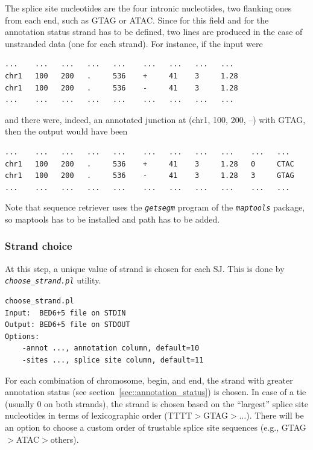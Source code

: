 \documentclass{article}
\newcommand{\prog}[1]{{\tt\em #1}}
\begin{document}
The splice site nucleotides are the four intronic nucleotides, two flanking ones from each end, such as GTAG or ATAC. Since for this field and for the annotation status strand 
has to be defined, two lines are produced in the case of unstranded data (one for each strand). For instance, if the input were
\begin{verbatim}
...    ...   ...   ...   ...    ...   ...   ...   ...
chr1   100   200   .     536    +     41    3     1.28
chr1   100   200   .     536    -     41    3     1.28
...    ...   ...   ...   ...    ...   ...   ...   ...
\end{verbatim}
and there were, indeed, an annotated junction at (chr1, 100, 200, --) with GTAG, then the output would have been
\begin{verbatim}
...    ...   ...   ...   ...    ...   ...   ...   ...    ...   ...
chr1   100   200   .     536    +     41    3     1.28   0     CTAC
chr1   100   200   .     536    -     41    3     1.28   3     GTAG
...    ...   ...   ...   ...    ...   ...   ...   ...    ...   ...
\end{verbatim}

Note that sequence retriever uses the \prog{getsegm} program of the \prog{maptools} package, so maptools has to be installed and path has to be added.


\subsubsection{Strand choice}
At this step, a unique value of strand is chosen for each SJ. This is done by \prog{choose\_strand.pl} utility. 
\begin{verbatim}
choose_strand.pl
Input:  BED6+5 file on STDIN
Output: BED6+5 file on STDOUT
Options:
	-annot ..., annotation column, default=10
	-sites ..., splice site column, default=11
\end{verbatim}
For each combination of chromosome, begin, and end, the strand with greater annotation status (see section~\ref{sec::annotation_status}) is chosen. In case of 
a tie (usually $0$ on both strands), the strand is chosen based on the ``largest'' splice site nucleotides in terms of lexicographic order (TTTT$>$GTAG$>\dots$).
There will be an option to choose a custom order of trustable splice site sequences (e.g., GTAG$>$ATAC$>$others).
\end{document}
